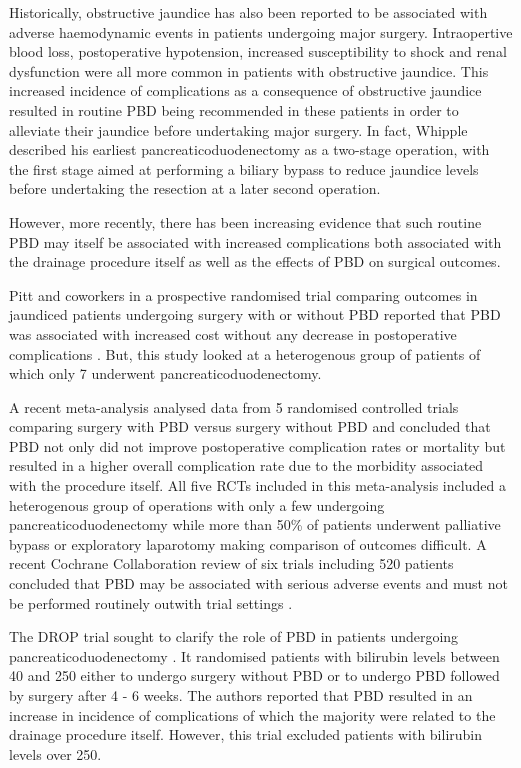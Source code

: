 Historically, obstructive jaundice has also been reported to be associated with adverse haemodynamic events in patients undergoing major surgery. Intraopertive blood loss, postoperative hypotension, increased susceptibility to shock and renal dysfunction were all more common in patients with obstructive jaundice. This increased incidence of complications as a consequence of obstructive jaundice resulted in routine PBD being recommended in these patients in order to alleviate their jaundice before undertaking major surgery. In fact, Whipple described his earliest pancreaticoduodenectomy as a two-stage operation, with the first stage aimed at performing a biliary bypass to reduce jaundice levels before undertaking the resection at a later second operation.

However, more recently, there has been increasing evidence that such routine PBD may itself be associated with increased complications both associated with the drainage procedure itself as well as the effects of PBD on surgical outcomes.

Pitt and coworkers in a prospective randomised trial comparing outcomes in jaundiced patients undergoing surgery with or without PBD reported that PBD was associated with increased cost without any decrease in postoperative complications \parencite{pitt_does_1985}. But, this study looked at a heterogenous group of patients of which only 7 underwent pancreaticoduodenectomy.

A recent meta-analysis \parencite{sewnath_meta-analysis_2002} analysed data from 5 randomised controlled trials comparing surgery with PBD versus surgery without PBD and concluded that PBD not only did not improve postoperative complication rates or mortality but resulted in a higher overall complication rate due to the morbidity associated with the procedure itself. All five RCTs included in this meta-analysis included a heterogenous group of operations with only a few undergoing pancreaticoduodenectomy while more than 50\% of patients underwent palliative bypass or exploratory laparotomy making comparison of outcomes difficult. A recent Cochrane Collaboration review of six trials including 520 patients concluded that PBD may be associated with serious adverse events and must not be performed routinely outwith trial settings \parencite{wang_preoperative_2008}.

The DROP trial sought to clarify the role of PBD in patients undergoing pancreaticoduodenectomy \parencite{van_der_gaag_preoperative_2010}. It randomised patients with bilirubin levels between 40 and 250 either to undergo surgery without PBD or to undergo PBD followed by surgery after 4 - 6 weeks. The authors reported that PBD resulted in an increase in incidence of complications of which the majority were related to the drainage procedure itself. However, this trial excluded patients with bilirubin levels over 250.

